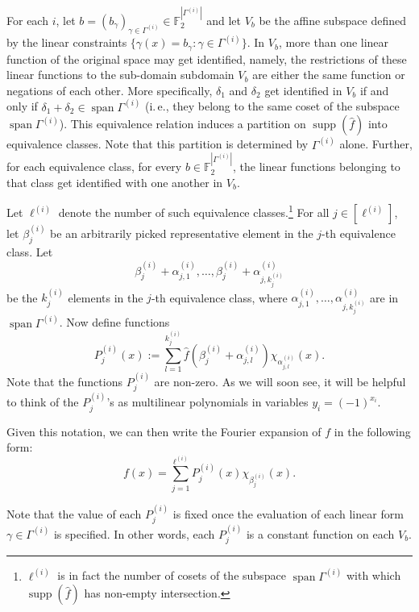 \documentclass[11pt]{article}
\numberwithin{equation}{section}
\theoremstyle{definition}
\theoremstyle{plain}
\newcommand{\ie}{i.\,e.}
\DeclareMathOperator{\Supp}{supp}
\DeclareMathOperator{\vspan}{span}
\begin{document}
For each $i$, let $b=(b_\gamma)_{\gamma \in \Gamma^{(i)}} \in
\mathbb{F}_2^{|\Gamma^{(i)}|}$ and let $V_{b}$ be the affine subspace
defined by the linear constraints $\{\gamma(x)=b_\gamma: \gamma \in
\Gamma^{(i)}\}$.  In $V_b$, more than one linear function of the
original space may get identified,
%
namely,  %
the restrictions of these linear functions to the
sub-domain  %
subdomain   %
$V_b$ are either the same function or negations of each
  other. More specifically, $\delta_1$ and $\delta_2$ get
identified in $V_b$ if and only if $\delta_1 + \delta_2 \in
\vspan\Gamma^{(i)}$ (\ie, %
they belong to the same coset of the subspace $\vspan\Gamma^{(i)}$). This equivalence relation
induces a partition on $\Supp(\widehat{f})$
into equivalence classes. Note that this partition is determined by $\Gamma^{(i)}$ alone.
Further, for each equivalence class, for every $b \in
\mathbb{F}_2^{|\Gamma^{(i)}|}$, the linear functions belonging to
that class get identified with one another in $V_b$. 

Let $\ell^{(i)}$ denote the number of such equivalence classes.\footnote{$\ell^{(i)}$ is in fact the number of cosets of the subspace
$\vspan\Gamma^{(i)}$ with which $\Supp(\widehat{f})$ has non-empty
intersection.} For all $j \in [\ell^{(i)}]$, let $\beta_j^{(i)}$ be an arbitrarily picked
representative element in the $j$-th equivalence class. Let
\[
  \beta_j^{(i)} + \alpha_{j,1}^{(i)},
  \ldots, \beta_j^{(i)} + \alpha_{j,{k_j^{(i)}}}^{(i)}
\]
be the $k_j^{(i)}$ elements in the $j$-th equivalence class, where
$\alpha_{j,1}^{(i)}, \ldots, \alpha_{j,{k_j^{(i)}}}^{(i)}$ are in
$\vspan\Gamma^{(i)}$. Now define functions
\[
  P_j^{(i)}(x) := \displaystyle\sum_{l=1}^{k_j^{(i)}}
  \widehat{f}\left(\beta_j^{(i)}+\alpha_{j,l}^{(i)}\right)\chi_{\alpha_{j,l}^{(i)}}(x).
\]
Note that the functions $P_j^{(i)}$ are non-zero.  As we will soon
see, it will be helpful to think of the $P_j^{(i)}$'s as
%
multilinear   %
polynomials in variables $y_i=(-1)^{x_i}$.

Given this notation, we can then write the Fourier expansion of $f$ in
the following form:
\[f(x)=\displaystyle\sum_{j=1}^{\ell^{(i)}}P_j^{(i)}(x)\chi_{\beta_j^{(i)}}(x).\]

Note that the value of each $P_j^{(i)}$ is fixed once the evaluation of each linear form $\gamma \in \Gamma^{(i)}$ is specified. In other words, each $P_j^{(i)}$ is a
constant function on each $V_b$.
\end{document}
